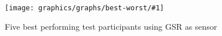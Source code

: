 \newcommand{\graphtheshit}[3]{
    \begin{figure}[h!]
    \begin{minipage}[t]{0.5\textwidth}
        \texttt{[image: graphics/graphs/best-worst/\#1]}
        \caption{#2}
        \label{#3}
    \end{minipage}
    \end{figure}
}

\newcommand{\somethingsomething}{
  \graphtheshit{best-False_cover_rate_(FCR)-Events_hit_rate_(EHR)-CovNu-GSR.pdf}
  {Five best performing test participants using GSR as sensor}{fig:best_five_gsr}
}

\somethingsomething